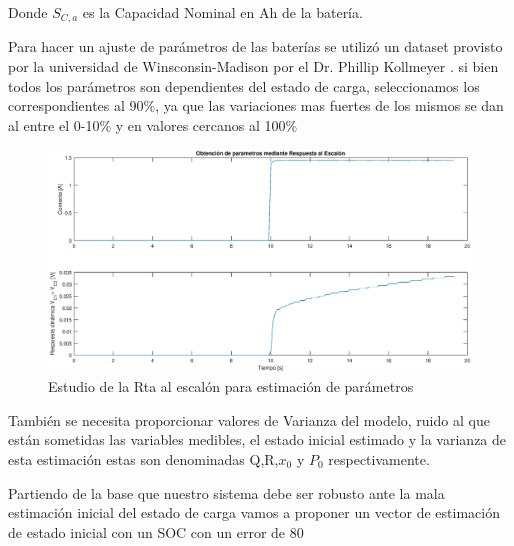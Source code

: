\documentclass[10pt,a4paper]{article}
\begin{document}
    Donde $S_{C,a}$ es la Capacidad Nominal en Ah de la batería. 

	Para hacer un ajuste de parámetros de las baterías se utilizó un dataset provisto por la universidad de Winsconsin-Madison por el Dr. Phillip Kollmeyer \cite{Kollmeyer2018}. si bien todos los parámetros son dependientes del estado de carga, seleccionamos los correspondientes al 90\%, ya que las variaciones mas fuertes de los mismos se dan al entre el 0-10\% y en valores cercanos al 100\%
	
	\begin{figure}[h!]
		\begin{center}
			\includegraphics[width=1\textwidth]{rta_escalon.eps}
			\caption{Estudio de la Rta al escalón para estimación de parámetros}
			\label{rta_escalon}
		\end{center}
	\end{figure}
    \FloatBarrier

	También se necesita proporcionar valores de Varianza del modelo, ruido al que están sometidas las variables medibles, el estado inicial estimado y la varianza de esta estimación estas son denominadas Q,R,$x_0$ y $P_0$ respectivamente.
	
	Partiendo de la base que nuestro sistema debe ser robusto ante la mala estimación inicial del estado de carga  vamos a proponer un vector de estimación de estado inicial con un SOC con un error de 80%
	
\end{document}

